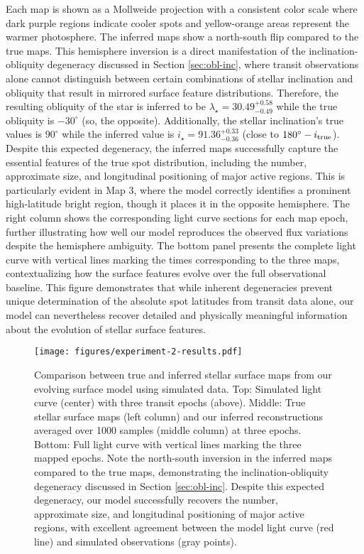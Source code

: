 \documentclass[twocolumn]{aastex631}
\begin{document}
Each map is shown as a Mollweide projection with a consistent color scale where dark purple regions indicate cooler spots and 
yellow-orange areas represent the warmer photosphere. The inferred maps show a north-south flip compared to the true maps. 
This hemisphere inversion is a direct manifestation of the inclination-obliquity degeneracy discussed in Section \ref{sec:obl-inc}, 
where transit observations alone cannot distinguish between certain combinations of stellar inclination and obliquity that result 
in mirrored surface feature distributions. Therefore, the resulting obliquity of the star is inferred to be 
$\lambda_\star=30.49^{+0.58}_{-0.49}$ while the true obliquity is $-30^\circ$ (so, the opposite). 
Additionally, the stellar inclination's true 
values is $90^\circ$ while the inferred value is $i_\star=91.36^{+0.33}_{-0.36}$ (close to $180^\circ-i_{\rm true}$).
Despite this expected degeneracy, the inferred maps successfully capture the essential features of the true spot distribution, 
including the number, approximate size, and longitudinal positioning of major active regions. This is particularly evident in 
Map 3, where the model correctly identifies a prominent high-latitude bright region, though it places it in the opposite 
hemisphere.
The right column shows the corresponding light curve sections for each map epoch, further illustrating how well our model 
reproduces the observed flux variations despite the hemisphere ambiguity. The bottom panel presents the complete light curve 
with vertical lines marking the times corresponding to the three maps, contextualizing how the surface features evolve over the 
full observational baseline.
This figure demonstrates that while inherent degeneracies prevent unique determination of the absolute spot latitudes from 
transit data alone, our model can nevertheless recover detailed and physically meaningful information about the evolution of 
stellar surface features.
%
\begin{figure*}[hbt!]
    \begin{centering}
        \texttt{[image: figures/experiment-2-results.pdf]}
        \caption{Comparison between true and inferred stellar surface maps from our evolving surface model using simulated data. 
        Top: Simulated light curve (center) with three transit epochs (above). Middle: True stellar surface maps (left column) 
        and our inferred reconstructions averaged over 1000 samples (middle column) at three epochs. Bottom: Full light curve 
        with vertical lines marking the three mapped epochs. Note the north-south inversion in the inferred maps compared to 
        the true maps, demonstrating the inclination-obliquity degeneracy discussed in Section \ref{sec:obl-inc}. 
        Despite this expected degeneracy, our model successfully recovers the number, approximate size, and longitudinal 
        positioning of major active regions, with excellent agreement between the model light curve (red line) and simulated 
        observations (gray points).}
        \label{fig:experiment-2-results}
    \end{centering}
\end{figure*}
%
\end{document}
